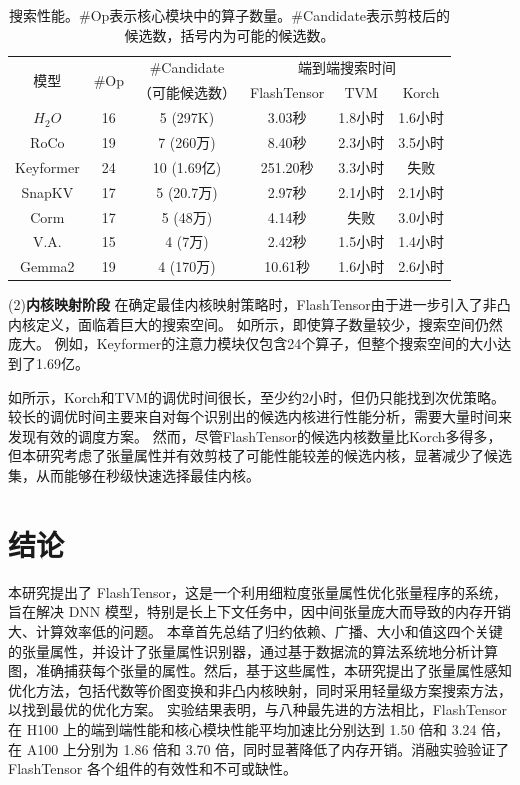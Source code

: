 \begin{table}[ht]
    \centering
    \caption{搜索性能。\#Op表示核心模块中的算子数量。\#Candidate表示剪枝后的候选数，括号内为可能的候选数。}
    \begin{tabular}{cccccc}
    \toprule
      \multirow{2}{*}{模型} &  \multirow{2}{*}{\#Op}  & \#Candidate& \multicolumn{3}{c}{端到端搜索时间} \\
                              &  & （可能候选数）& FlashTensor & TVM & Korch \\
      \(H_{2}O\)      & 16 & 5 (297K) & 3.03秒    & 1.8小时   & 1.6小时\\
      RoCo      & 19 & 7 (260万) & 8.40秒    & 2.3小时   & 3.5小时\\
      Keyformer & 24 & 10 (1.69亿) & 251.20秒 &3.3小时    & 失败 \\
      SnapKV    & 17 & 5 (20.7万) & 2.97秒    & 2.1小时   & 2.1小时\\
      Corm      & 17 & 5 (48万) & 4.14秒    & 失败 & 3.0小时\\
      V.A. & 15 & 4 (7万) & 2.42秒          & 1.5小时   & 1.4小时\\
      Gemma2    & 19  & 4 (170万) & 10.61秒  & 1.6小时   & 2.6小时 \\
      \bottomrule
    \end{tabular}
    \label{tab:search}
\end{table}



(2)\textbf{内核映射阶段}
在确定最佳内核映射策略时，FlashTensor由于进一步引入了非凸内核定义，面临着巨大的搜索空间。
如所示，即使算子数量较少，搜索空间仍然庞大。
例如，Keyformer的注意力模块仅包含24个算子，但整个搜索空间的大小达到了1.69亿。

如所示，Korch和TVM的调优时间很长，至少约2小时，但仍只能找到次优策略。
较长的调优时间主要来自对每个识别出的候选内核进行性能分析，需要大量时间来发现有效的调度方案。
然而，尽管FlashTensor的候选内核数量比Korch多得多，但本研究考虑了张量属性并有效剪枝了可能性能较差的候选内核，显著减少了候选集，从而能够在秒级快速选择最佳内核。

\section{结论}
本研究提出了 FlashTensor，这是一个利用细粒度张量属性优化张量程序的系统，旨在解决 DNN 模型，特别是长上下文任务中，因中间张量庞大而导致的内存开销大、计算效率低的问题。
本章首先总结了归约依赖、广播、大小和值这四个关键的张量属性，并设计了张量属性识别器，通过基于数据流的算法系统地分析计算图，准确捕获每个张量的属性。然后，基于这些属性，本研究提出了张量属性感知优化方法，包括代数等价图变换和非凸内核映射，同时采用轻量级方案搜索方法，以找到最优的优化方案。
实验结果表明，与八种最先进的方法相比，FlashTensor 在 H100 上的端到端性能和核心模块性能平均加速比分别达到 1.50 倍和 3.24 倍，在 A100 上分别为 1.86 倍和 3.70 倍，同时显著降低了内存开销。消融实验验证了 FlashTensor 各个组件的有效性和不可或缺性。

